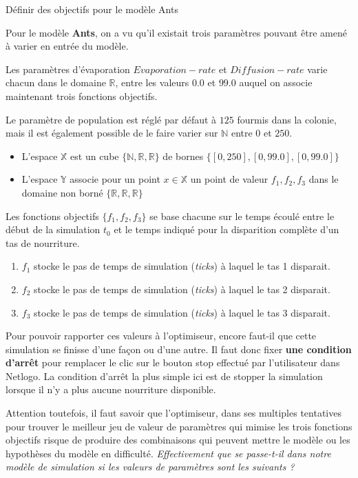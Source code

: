 \begin{testiv}{Définir des objectifs pour le modèle Ants}{}

Pour le modèle \textbf{Ants}, on a vu qu'il existait trois paramètres pouvant être amené à varier en entrée du modèle.

Les paramètres d'évaporation $Evaporation-rate$ et $Diffusion-rate$ varie chacun dans le domaine $\mathbb{R}$, entre les valeurs $0.0$ et $99.0$ auquel on associe maintenant trois fonctions objectifs.

Le paramètre de population est réglé par défaut à $125$ fourmis dans la colonie, mais il est également possible de le faire varier sur $\mathbb{N}$ entre $0$ et $250$.

\begin{itemize}[noitemsep,nolistsep]
\item L'espace $\mathbb{X}$ est un cube $\{\mathbb{N},\mathbb{R},\mathbb{R}\}$ de bornes $\{[0,250], [0,99.0], [0,99.0]\}$
\item L'espace $\mathbb{Y}$ associe pour un point $x \in \mathbb{X}$ un point de valeur ${f_1,f_2,f_3}$ dans le domaine non borné $\{\mathbb{R},\mathbb{R},\mathbb{R}\}$
\end{itemize}

Les fonctions objectifs $\{f_1,f_2,f_3\}$  se base chacune sur le temps écoulé entre le début de la simulation $t_0$ et le temps indiqué pour la disparition complète d'un tas de nourriture.

\begin{enumerate}
\item $f_1$ stocke le pas de temps de simulation (\textit{ticks}) à laquel le tas 1 disparait.
\item $f_2$ stocke le pas de temps de simulation (\textit{ticks}) à laquel le tas 2 disparait.
\item $f_3$ stocke le pas de temps de simulation (\textit{ticks}) à laquel le tas 3 disparait.
\end{enumerate}

Pour pouvoir rapporter ces valeurs à l'optimiseur, encore faut-il que cette simulation se finisse d'une façon ou d'une autre. Il faut donc fixer \textbf{une condition d'arrêt} pour remplacer le clic sur le bouton stop effectué par l'utilisateur dans Netlogo. La condition d'arrêt la plus simple ici est de stopper la simulation lorsque il n'y a plus aucune nourriture disponible.

Attention toutefois, il faut savoir que l'optimiseur, dans ses multiples tentatives pour trouver le meilleur jeu de valeur de paramètres qui mimise les trois fonctions objectifs risque de produire des combinaisons qui peuvent mettre le modèle ou les hypothèses du modèle en difficulté. \textit{Effectivement que se passe-t-il dans notre modèle de simulation si les valeurs de paramètres sont les suivants ? }


\end{testiv}
